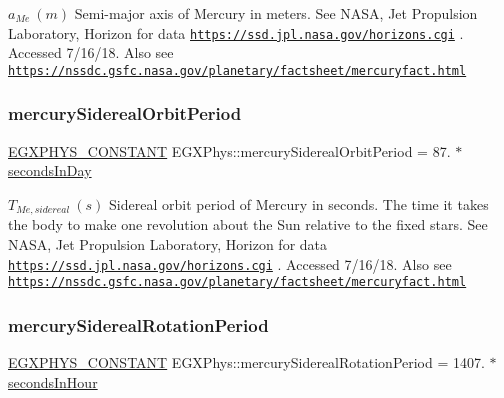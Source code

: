 $ a_{Me} \ (m)$ Semi-\/major axis of Mercury in meters. See N\+A\+SA, Jet Propulsion Laboratory, Horizon for data \href{https://ssd.jpl.nasa.gov/horizons.cgi}{\tt https\+://ssd.\+jpl.\+nasa.\+gov/horizons.\+cgi} . Accessed 7/16/18. Also see \href{https://nssdc.gsfc.nasa.gov/planetary/factsheet/mercuryfact.html}{\tt https\+://nssdc.\+gsfc.\+nasa.\+gov/planetary/factsheet/mercuryfact.\+html} \mbox{\label{group___e_g_x_phys-_constants-_astrophysics-_solar_system-_mercury-_orbit_gadd4d21698bc8b7f0780629e95cea5f52}} 
\subsubsection{\texorpdfstring{mercury\+Sidereal\+Orbit\+Period}{mercurySiderealOrbitPeriod}}
{\footnotesize\ttfamily \mbox{\hyperlink{group___e_g_x_phys-_constants-_macros_ga76980d288494ce1714c9ac68a95ba702}{E\+G\+X\+P\+H\+Y\+S\+\_\+\+C\+O\+N\+S\+T\+A\+NT}} E\+G\+X\+Phys\+::mercury\+Sidereal\+Orbit\+Period = 87. $\ast$ \mbox{\hyperlink{namespace_e_g_x_phys_a93d2a00d75411b58cbf63ab3fd1f8bc2}{seconds\+In\+Day}}}

$ T_{Me,sidereal} \ (s)$ Sidereal orbit period of Mercury in seconds. The time it takes the body to make one revolution about the Sun relative to the fixed stars. See N\+A\+SA, Jet Propulsion Laboratory, Horizon for data \href{https://ssd.jpl.nasa.gov/horizons.cgi}{\tt https\+://ssd.\+jpl.\+nasa.\+gov/horizons.\+cgi} . Accessed 7/16/18. Also see \href{https://nssdc.gsfc.nasa.gov/planetary/factsheet/mercuryfact.html}{\tt https\+://nssdc.\+gsfc.\+nasa.\+gov/planetary/factsheet/mercuryfact.\+html} \mbox{\label{group___e_g_x_phys-_constants-_astrophysics-_solar_system-_mercury-_orbit_ga5908bc1ce452d68e135a79df00e7b242}} 
\subsubsection{\texorpdfstring{mercury\+Sidereal\+Rotation\+Period}{mercurySiderealRotationPeriod}}
{\footnotesize\ttfamily \mbox{\hyperlink{group___e_g_x_phys-_constants-_macros_ga76980d288494ce1714c9ac68a95ba702}{E\+G\+X\+P\+H\+Y\+S\+\_\+\+C\+O\+N\+S\+T\+A\+NT}} E\+G\+X\+Phys\+::mercury\+Sidereal\+Rotation\+Period = 1407. $\ast$ \mbox{\hyperlink{namespace_e_g_x_phys_a7c3165cd93e36f1fb8e9fef80f117bef}{seconds\+In\+Hour}}}

